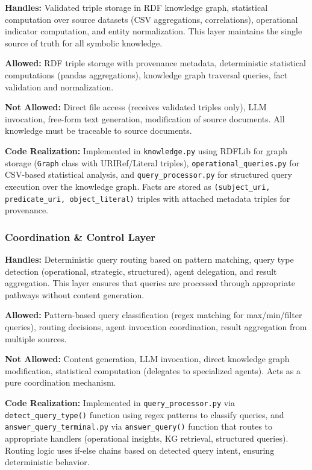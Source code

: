 \textbf{Handles:} Validated triple storage in RDF knowledge graph, statistical computation over source datasets (CSV aggregations, correlations), operational indicator computation, and entity normalization. This layer maintains the single source of truth for all symbolic knowledge.

\textbf{Allowed:} RDF triple storage with provenance metadata, deterministic statistical computations (pandas aggregations), knowledge graph traversal queries, fact validation and normalization.

\textbf{Not Allowed:} Direct file access (receives validated triples only), LLM invocation, free-form text generation, modification of source documents. All knowledge must be traceable to source documents.

\textbf{Code Realization:} Implemented in \texttt{knowledge.py} using RDFLib for graph storage (\texttt{Graph} class with URIRef/Literal triples), \texttt{operational\_queries.py} for CSV-based statistical analysis, and \texttt{query\_processor.py} for structured query execution over the knowledge graph. Facts are stored as \texttt{(subject\_uri, predicate\_uri, object\_literal)} triples with attached metadata triples for provenance.

\subsubsection{Coordination \& Control Layer}

\textbf{Handles:} Deterministic query routing based on pattern matching, query type detection (operational, strategic, structured), agent delegation, and result aggregation. This layer ensures that queries are processed through appropriate pathways without content generation.

\textbf{Allowed:} Pattern-based query classification (regex matching for max/min/filter queries), routing decisions, agent invocation coordination, result aggregation from multiple sources.

\textbf{Not Allowed:} Content generation, LLM invocation, direct knowledge graph modification, statistical computation (delegates to specialized agents). Acts as a pure coordination mechanism.

\textbf{Code Realization:} Implemented in \texttt{query\_processor.py} via \texttt{detect\_query\_type()} function using regex patterns to classify queries, and \texttt{answer\_query\_terminal.py} via \texttt{answer\_query()} function that routes to appropriate handlers (operational insights, KG retrieval, structured queries). Routing logic uses if-else chains based on detected query intent, ensuring deterministic behavior.

